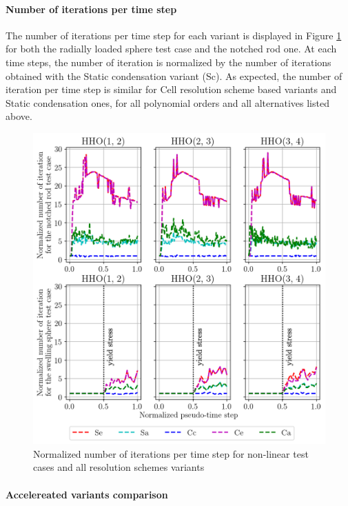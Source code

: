 \paragraph{Number of iterations per time step}

The number of iterations per time step for each variant
is displayed in Figure \ref{fig_acceleration_res_0} for both the radially loaded sphere test case
and the notched rod one.
At each time steps, the number of iteration is normalized by the number of iterations obtained with the
Static condensation variant (Sc).
As expected, the number of iteration per time step is similar for Cell resolution scheme based variants and Static condensation ones, for all polynomial orders and all alternatives listed above.

\begin{figure}[H]
    \centering
    \includegraphics[width=12.cm]{../chapter_002_hho_mechanics/figures/plot_global_iterations__4_ordn.png}
    \caption{Normalized number of iterations per time step for non-linear test cases and all resolution schemes variants}
    \label{fig_acceleration_res_0}
\end{figure}

\paragraph{Accelereated variants comparison}

